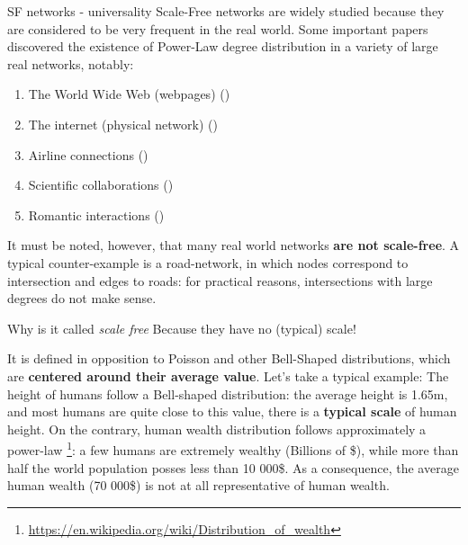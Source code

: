 \begin{textbox}{SF networks - universality}
    Scale-Free networks are widely studied because they are considered to be very frequent in the real world. Some important papers discovered the existence of Power-Law degree distribution in a variety of large real networks, notably:
    \begin{enumerate}
        \item The World Wide Web (webpages) (\cite{barabasi1999emergence})
        \item The internet (physical network) (\cite{faloutsos1999power})
        \item Airline connections (\cite{guimera2004modeling})
        \item Scientific collaborations (\cite{newman2001structure})
        \item Romantic interactions (\cite{liljeros2001web})
    \end{enumerate}
    It must be noted, however, that many real world networks \textbf{are not scale-free}. A typical counter-example is a road-network, in which nodes correspond to intersection and edges to roads: for practical reasons, intersections with large degrees do not make sense.
\end{textbox}


\begin{textbox}{Why is it called \textit{scale free}}
    Because they have no (typical) scale!

    It is defined in opposition to Poisson and other Bell-Shaped distributions, which are \textbf{centered around their average value}. Let's take a typical example: The height of humans follow a Bell-shaped distribution: the average height is 1.65m, and most humans are quite close to this value, there is a \textbf{typical scale} of human height. On the contrary, human wealth distribution follows approximately a power-law \footnote{ \url{https://en.wikipedia.org/wiki/Distribution_of_wealth}}: a few humans are extremely wealthy (Billions of \$), while more than half the world population posses less than 10 000\$. As a consequence, the average human wealth (70 000\$) is not at all representative of human wealth.
\end{textbox}


